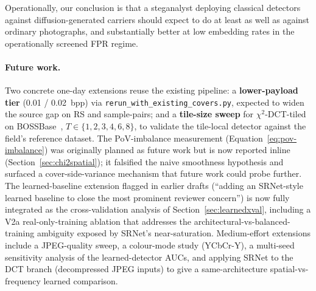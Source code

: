 \documentclass[10pt,twocolumn,a4paper]{article}
\begin{document}
Operationally, our conclusion is that a steganalyst deploying classical detectors against diffusion-generated carriers should expect to do at least as well as against ordinary photographs, and substantially better at low embedding rates in the operationally screened FPR regime.

\paragraph{Future work.} Two concrete one-day extensions reuse the existing pipeline: a \textbf{lower-payload tier} (0.01 / 0.02~bpp) via \texttt{rerun\_with\_existing\_covers.py}, expected to widen the source gap on RS and sample-pairs; and a \textbf{tile-size sweep} for $\chi^2$-DCT-tiled on BOSSBase~\cite{bas2011boss}, $T\!\in\!\{1,2,3,4,6,8\}$, to validate the tile-local detector against the field's reference dataset. The PoV-imbalance measurement (Equation~\ref{eq:pov-imbalance}) was originally planned as future work but is now reported inline (Section~\ref{sec:chi2spatial}); it falsified the naive smoothness hypothesis and surfaced a cover-side-variance mechanism that future work could probe further. The learned-baseline extension flagged in earlier drafts (``adding an SRNet-style learned baseline to close the most prominent reviewer concern'') is now fully integrated as the cross-validation analysis of Section~\ref{sec:learnedxval}, including a V2a real-only-training ablation that addresses the architectural-vs-balanced-training ambiguity exposed by SRNet's near-saturation. Medium-effort extensions include a JPEG-quality sweep, a colour-mode study (YCbCr-Y), a multi-seed sensitivity analysis of the learned-detector AUCs, and applying SRNet to the DCT branch (decompressed JPEG inputs) to give a same-architecture spatial-vs-frequency learned comparison.

\clearpage
\renewcommand{\refname}{References}
\end{document}
